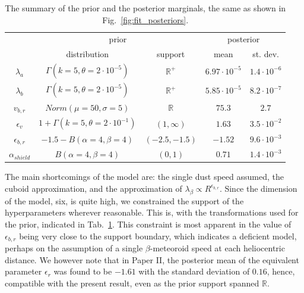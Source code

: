 \begin{table}[t]
\caption{The summary of the prior and the posterior marginals, the same as shown in Fig.~\ref{fig:fit_posteriors}.}
\centering
\label{tab:prior_posterior}
\begin{tabular}{c|cc|cc}
\multicolumn{1}{c}{  } \vline & \multicolumn{2}{c}{prior} \vline & \multicolumn{2}{c}{posterior} \\ 
& distribution & support & mean & st. dev. \\
\hline
$\lambda_a$ & $\Gamma(k=5,\theta=2\cdot10^{-5})$ & $\mathbb{R}^+$ &
$6.97 \cdot 10^{-5}$ & $1.4 \cdot 10^{-6}$  \\
$\lambda_b$ & $\Gamma(k=5,\theta=2\cdot10^{-5})$ & $\mathbb{R}^+$ & 
$5.85 \cdot 10^{-5}$ & $8.2 \cdot 10^{-7}$  \\
$v_{b,r}$ & $Norm(\mu=50,\sigma=5)$ & $\mathbb{R}$ & 
$75.3$ & $2.7$  \\
$\epsilon_v$ & $1+\Gamma(k=5,\theta=2\cdot10^{-1})$ & $(1,\infty)$ &
$1.63$ & $3.5 \cdot 10^{-2}$  \\
$\epsilon_{b,r}$ & $-1.5-B(\alpha=4,\beta=4)$ & $(-2.5,-1.5)$ &
$-1.52$ & $9.6 \cdot 10^{-3}$  \\
$\alpha_{shield}$ & $B(\alpha=4,\beta=4)$ & $(0,1)$ & 
$0.71$ & $1.4 \cdot 10^{-3}$  \\
\hline
\end{tabular}
\end{table}

The main shortcomings of the model are: the single dust speed assumed, the cuboid approximation, and the approximation of $\lambda_\beta \propto R^{\epsilon_{b,r}}$. Since the dimension of the model, six, is quite high, we constrained the support of the hyperparameters wherever reasonable. This is, with the transformations used for the prior, indicated in Tab.~\ref{tab:prior_posterior}. This constraint is most apparent in the value of $\epsilon_{b,r}$ being very close to the support boundary, which indicates a deficient model, perhaps on the assumption of a single $\beta$-meteoroid speed at each heliocentric distance. We however note that in Paper II, the posterior mean of the equivalent parameter $\epsilon_r$ was found to be $-1.61$ with the standard deviation of $0.16$, hence, compatible with the present result, even as the prior support spanned $\mathbb{R}$.

